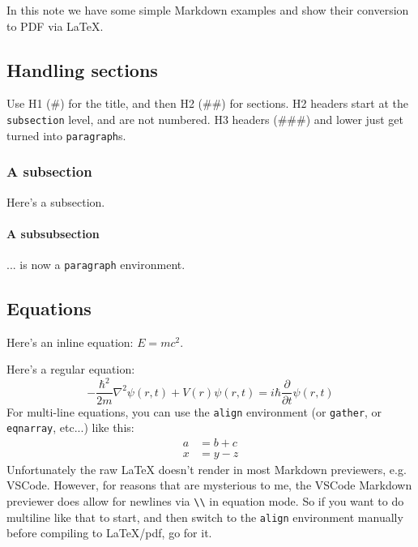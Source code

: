 \documentclass[11pt,letterpaper]{article}
\begin{document}
In this note we have some simple Markdown examples and show their conversion to PDF via LaTeX.

\subsection{Handling sections}
Use H1 (\#) for the title, and then H2 (\#\#) for sections.
H2 headers start at the \texttt{subsection} level, and are not numbered.
H3 headers (\#\#\#) and lower just get turned into \texttt{paragraph}s.

\subsubsection{A subsection}
Here's a subsection.

\paragraph{A subsubsection}
... is now a \texttt{paragraph} environment.

\subsection{Equations}
Here's an inline equation: \(E = mc^2\).

Here's a regular equation:
\begin{equation}
    -\frac{\hbar^2}{2m}\nabla^2\psi(r,t) + V(r)\psi(r,t) = i\hbar \frac{\partial}{\partial t}\psi(r,t)
\end{equation}
For multi-line equations, you can use the \texttt{align} environment (or \texttt{gather}, or \texttt{eqnarray}, etc...) like this:
\begin{align}
    a & = b + c \\
    x & = y - z
\end{align}
Unfortunately the raw LaTeX doesn't render in most Markdown previewers, e.g. VSCode.
However, for reasons that are mysterious to me, the VSCode Markdown previewer does allow for newlines via \texttt{{\textbackslash}{\textbackslash}} in equation mode. So if you want to do multiline like that to start, and then switch to the \texttt{align} environment manually before compiling to LaTeX/pdf, go for it.
\end{document}
